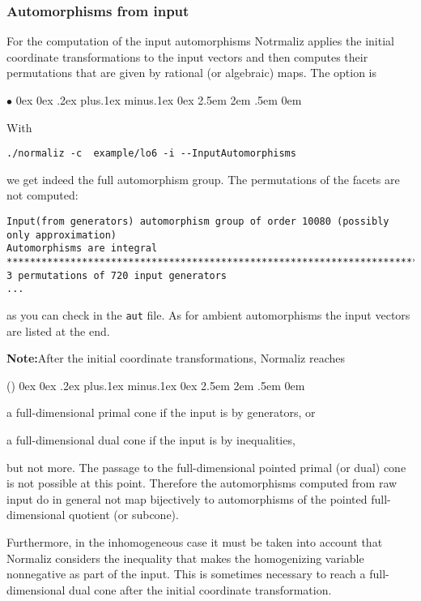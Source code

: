 \documentclass[12pt,a4paper]{scrartcl}
\newcounter{listi}
\newcommand{\stdli}{ \topsep0ex \partopsep0ex %
\parsep.2ex plus.1ex minus.1ex \itemsep0ex%
\leftmargin2.5em \labelwidth2em \labelsep.5em \rightmargin0em}%
\newenvironment{arab}{\begin{list}{\textup{(\arabic{listi})}}%
	{\usecounter{listi}\stdli}}{\end{list}}
\renewenvironment{itemize}{\begin{list}{{$\bullet$}}{\stdli}}{\end{list}}
\theoremstyle{definition}
\def\itemtt[#1]{\item[\textbf{\ttt{#1}}]}
\def\ttt{\texttt}
\begin{document}
\subsubsection{Automorphisms from input}\label{input_auto}

For the computation of the input automorphisms Notrmaliz applies the initial coordinate transformations to the input vectors and then computes  their permutations that are given by rational (or algebraic) maps. The option is
\begin{itemize}
	\itemtt[InputAutomorphisms]
\end{itemize}
With
\begin{Verbatim}
./normaliz -c  example/lo6 -i --InputAutomorphisms
\end{Verbatim}
we get indeed the full automorphism group. The permutations of the facets are not computed:
\begin{Verbatim}
Input(from generators) automorphism group of order 10080 (possibly only approximation)
Automorphisms are integral
************************************************************************
3 permutations of 720 input generators
...
\end{Verbatim}
as you can check in the \verb|aut| file. As for ambient automorphisms the input vectors are listed at the end.

\textbf{Note:}\enspace After the initial coordinate transformations, Normaliz reaches
\begin{arab}
\item a full-dimensional primal cone if the input is by generators, or
\item a full-dimensional dual cone if the input is by inequalities,
\end{arab}
but not more. The passage to the full-dimensional pointed primal (or dual) cone is not possible at this point. Therefore the automorphisms computed from raw input do in general not map bijectively to automorphisms of the pointed full-dimensional quotient (or subcone).

Furthermore, in the inhomogeneous case it must be taken into account that Normaliz considers the inequality that makes the homogenizing variable nonnegative as part of the input. This is sometimes necessary to reach a full-dimensional dual cone after the initial coordinate transformation. 
\end{document}
